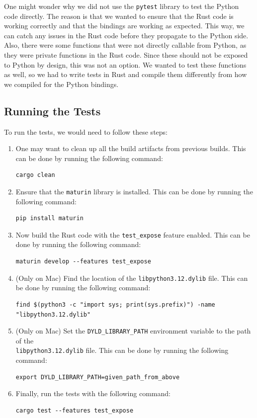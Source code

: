 \documentclass[review]{AIM_report}
\begin{document}
One might wonder why we did not use the \texttt{pytest} library to test the Python code directly. The reason is that we wanted to ensure that the Rust code is working correctly and that the bindings are working as expected. This way, we can catch any issues in the Rust code before they propagate to the Python side.
Also, there were some functions that were not directly callable from Python, as they were private functions in the Rust code. Since these should not be exposed to Python by design, this was not an option. We wanted to test these functions as well, so we had to write tests in Rust and compile them differently from how we compiled for the Python bindings.

\subsection{Running the Tests}
To run the tests, we would need to follow these steps:
\begin{enumerate}
    \item One may want to clean up all the build artifacts from previous builds. This can be done by running the following command:
          \begin{verbatim}cargo clean
    \end{verbatim}
    \item Ensure that the \texttt{maturin} library is installed. This can be done by running the following command:
          \begin{verbatim}pip install maturin
    \end{verbatim}
    \item Now build the Rust code with the \texttt{test\_expose} feature enabled. This can be done by running the following command:
          \begin{verbatim}maturin develop --features test_expose
    \end{verbatim}
    \item (Only on Mac) Find the location of the \texttt{libpython3.12.dylib} file. This can be done by running the following command:
          \begin{verbatim}find $(python3 -c "import sys; print(sys.prefix)") -name "libpython3.12.dylib"
    \end{verbatim}
    \item (Only on Mac) Set the \texttt{DYLD\_LIBRARY\_PATH} environment variable to the path of the \\\texttt{libpython3.12.dylib} file. This can be done by running the following command:
          \begin{verbatim}export DYLD_LIBRARY_PATH=given_path_from_above
    \end{verbatim}
    \item Finally, run the tests with the following command:
          \begin{verbatim}cargo test --features test_expose
    \end{verbatim}
\end{enumerate}
\end{document}
